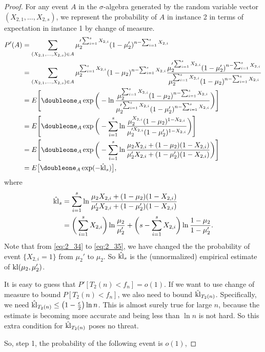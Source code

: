 \begin{proof}
    For any event $A$ in the $\sigma$-algebra generated by the random variable vector
    $(X_{2,1}, \dots, X_{2,s})$,
    we represent the probability of $A$ in instance 2 in terms of
    expectation in instance 1 by change of measure.
    \begin{align}
        P'(A)
            &= \sum_{(X_{2,1},\dots,X_{2,s})\in A}
                \mu_2'^{\sum_{i=1}^s X_{2,i}}(1-\mu_2')^{n-\sum_{i=1}^s X_{2,i}} \label{eq:2_34} \\
            &= \sum_{(X_{2,1},\dots,X_{2,s})\in A}
                \mu_2^{\sum_{i=1}^s X_{2,i}}(1-\mu_2)^{n-\sum_{i=1}^s X_{2,i}}
                \frac{\mu_2'^{\sum_{i=1}^s X_{2,i}}(1-\mu_2')^{n-\sum_{i=1}^s X_{2,i}}}
                {\mu_2^{\sum_{i=1}^s X_{2,i}}(1-\mu_2)^{n-\sum_{i=1}^s X_{2,i}}} \label{eq:2_35} \\
            &= E\Bigg[\doubleone_A \exp\bigg(-\ln
                \frac{\mu_2^{\sum_{i=1}^s X_{2,i}}(1-\mu_2)^{n-\sum_{i=1}^s X_{2,i}}}
                {\mu_2'^{\sum_{i=1}^s X_{2,i}}(1-\mu_2')^{n-\sum_{i=1}^s X_{2,i}}}\bigg)\Bigg] \\
            &= E\Bigg[\doubleone_A \exp\bigg(-\sum_{i=1}^s \ln
                \frac{\mu_2^{X_{2,i}}(1-\mu_2)^{1-X_{2,i}}}
                {\mu_2'^{X_{2,i}}(1-\mu_2')^{1-X_{2,i}}}\bigg)\Bigg] \\
            &= E\Bigg[\doubleone_A \exp\bigg(-\sum_{i=1}^s \ln
                \frac{\mu_2 X_{2,i} + (1-\mu_2) (1-X_{2,i})}
                {\mu_2' X_{2,i} + (1-\mu_2')(1-X_{2,i})}\bigg)\Bigg] \\
            &= E\big[\doubleone_A \exp(-\hat\kl_s)\big],
    \end{align}
    where
    \begin{align}
        \hat{{\mathop{\mathrm{kl}}}}_s
            &= \sum_{i=1}^s \ln
                \frac{\mu_2 X_{2,i} + (1-\mu_2) (1-X_{2,i})}
                {\mu_2' X_{2,i} + (1-\mu_2')(1-X_{2,i})} \\
            &= \bigg(\sum_{i=1}^s X_{2,i}\bigg)\ln\frac{\mu_2}{\mu_2'} +
                \bigg(s-\sum_{i=1}^s X_{2,i}\bigg)\ln\frac{1-\mu_2}{1-\mu_2'}.
    \end{align}
    Note that from \eqref{eq:2_34} to \eqref{eq:2_35},
    we have changed the the probability of event $\{X_{2,i}=1\}$ from $\mu_2'$ to $\mu_2$.
    So $\hat{{\mathop{\mathrm{kl}}}}_s$ is the (unnormalized) empirical estimate of ${\mathop{\mathrm{kl}}}(\mu_2,\mu_2')$.


    It is easy to guess that $P'[T_2(n)<f_n]=o(1)$.
    If we want to use change of measure to bound $P[T_2(n)<f_n]$,
    we also need to bound $\hat{{\mathop{\mathrm{kl}}}}_{T_2(n)}$.
    Specifically, we need $\hat{{\mathop{\mathrm{kl}}}}_{T_2(n)} \le \big(1-\frac{\epsilon}{2}\big)\ln n$.
    This is almost surely true for large $n$,
    because the estimate is becoming more accurate
    and being less than $\ln n$ is not hard.
    So this extra condition for $\hat{{\mathop{\mathrm{kl}}}}_{T_2(n)}$ poses no threat.

    So, step 1, the probability of the following event is $o(1)$,


\end{proof}
